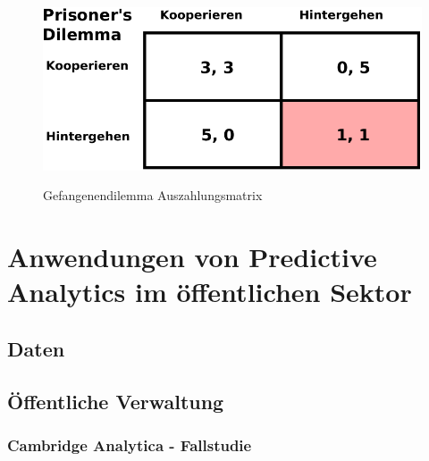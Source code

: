 \documentclass[12pt,a4paper,listof=totoc,oneside]{scrreprt}
\begin{document}
\begin{figure}%
\centering
\caption{Gefangenendilemma Auszahlungsmatrix}
\includegraphics[scale=0.8]{Grafiken/Prisoner_Ink.pdf} 
\label{pic:Prisoner}
\end{figure}
\section{Anwendungen von Predictive Analytics im öffentlichen Sektor}


\subsection{Daten}


\subsection{Öffentliche Verwaltung}


\subsubsection{Cambridge Analytica - Fallstudie}
\end{document}
